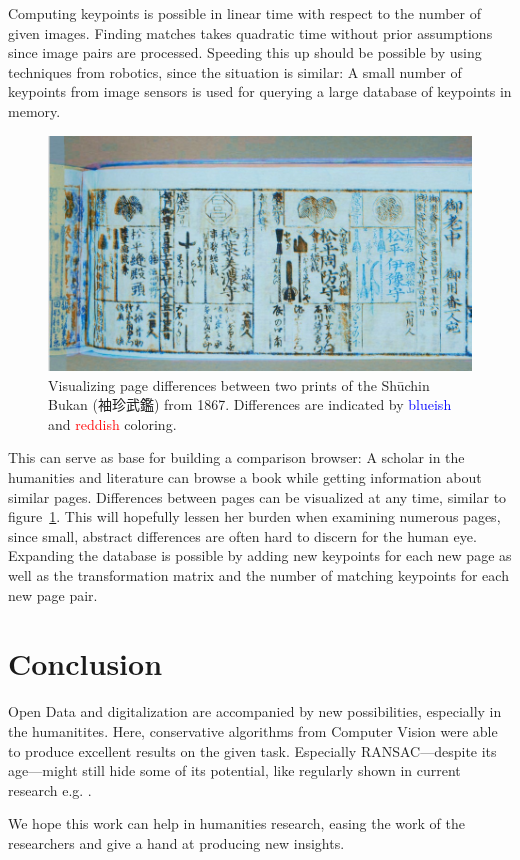 \documentclass{ltjarticle}
\begin{document}
Computing keypoints is possible in linear time with respect to the number of given images. Finding matches takes quadratic time without prior assumptions since image pairs are processed. Speeding this up should be possible by using techniques from robotics, since the situation is similar: A small number of keypoints from image sensors is used for querying a large database of keypoints in memory.

\begin{figure}
    \centering
    \includegraphics[width=\textwidth]{200019646_00006}
    \caption[Visualizing page differences]{Visualizing page differences between two prints of the Shūchin Bukan (袖珍武鑑) from 1867. Differences are indicated by \textcolor{blue}{blueish} and \textcolor{red}{reddish} coloring.}
    \label{fig:page-compare}
\end{figure}

This can serve as base for building a comparison browser: A scholar in the humanities and literature can browse a book while getting information about similar pages. Differences between pages can be visualized at any time, similar to figure~\ref{fig:page-compare}. This will hopefully lessen her burden when examining numerous pages, since small, abstract differences are often hard to discern for the human eye. Expanding the database is possible by adding new keypoints for each new page as well as the transformation matrix and the number of matching keypoints for each new page pair.

\section{Conclusion}

Open Data and digitalization are accompanied by new possibilities, especially in the humanitites. Here, conservative algorithms from Computer Vision were able to produce excellent results on the given task. Especially RANSAC---despite its age---might still hide some of its potential, like regularly shown in current research e.g. \cite{shen2019ransac}.

We hope this work can help in humanities research, easing the work of the researchers and give a hand at producing new insights.

\printbibliography
\end{document}
